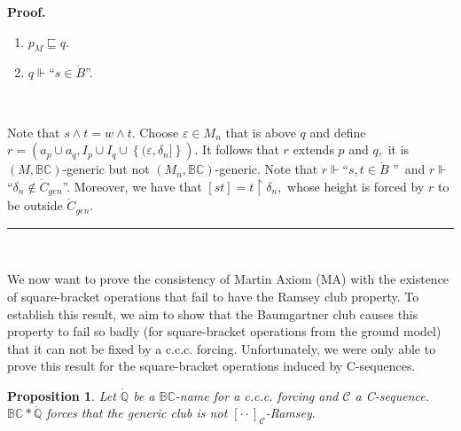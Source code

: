 \documentclass{article}
\newtheorem{proposition}[theorem]{Proposition}
\newenvironment{proof}[1][Proof]{\noindent\textbf{#1.} }{\ \rule{0.5em}{0.5em}}
\begin{document}
\begin{proof}
\begin{enumerate}
\item $p_{M}\sqsubseteq q.$

\item $q\Vdash$\textquotedblleft$s\in\dot{B}$\textquotedblright.
\end{enumerate}

\qquad\ \ \ \qquad\ \ \ 

Note that $s\wedge t=w\wedge t.$ Choose $\varepsilon\in M_{n}$ that is above
$q$ and define $r=\left(  a_{p}\cup a_{q},I_{p}\cup I_{q}\cup\left\{
(\varepsilon,\delta_{n}]\right\}  \right)  .$ It follows that $r$ extends $p$
and $q,$ it is $(M,\mathbb{BC})$-generic but not $(M_{n},\mathbb{BC}%
)$-generic. Note that $r\Vdash$\textquotedblleft$s,t\in\dot{B}$%
\textquotedblright\ and $r\Vdash$\textquotedblleft$\delta_{n}\notin\dot
{C}_{gen}$\textquotedblright. Moreover, we have that $\left[  st\right]
=t\upharpoonright\delta_{n},$ whose height is forced by $r$ to be outside
$\dot{C}_{gen}.$
\end{proof}

\qquad\qquad\qquad\ \ \qquad\ \ \ 

We now want to prove the consistency of Martin Axiom (\textsf{MA}) with the
existence of square-bracket operations that fail to have the Ramsey club
property. To establish this result, we aim to show that the Baumgartner club
causes this property to fail so badly (for square-bracket operations from the
ground model) that it can not be fixed by a \textsf{c.c.c.} forcing.
Unfortunately, we were only able to prove this result for the square-bracket
operations induced by \textsf{C}-sequences.

\begin{proposition}
Let $\mathbb{\dot{Q}}$ be a $\mathbb{BC}$-name for a \textsf{c.c.c.} forcing
and $\mathcal{C}$ a \textsf{C}-sequence. $\mathbb{BC\ast\dot{Q}}$ forces that
the generic club is not $[\cdot\cdot]_{\mathcal{C}}$-Ramsey$.$
\label{Prop ccc no arregla}
\end{proposition}
\end{document}
